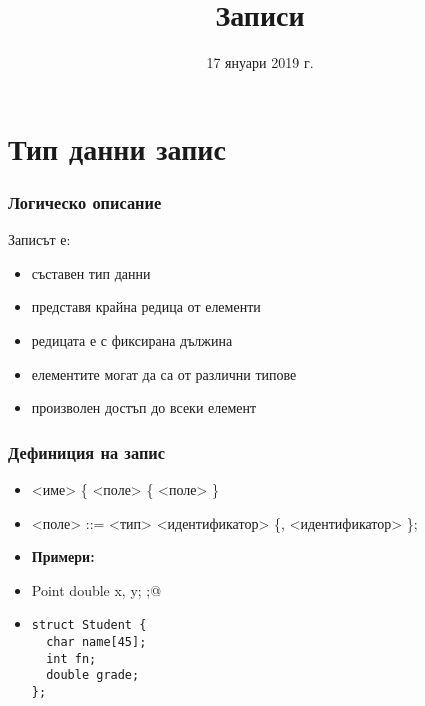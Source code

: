 \documentclass[alsotrans]{beamerswitch}
\title{Записи}
\date{17 януари 2019 г.}
\begin{document}
\begin{frame}
  \titlepage
\end{frame}

\section{Тип данни запис}


\begin{frame}
  \frametitle{Логическо описание}

Записът е:
\begin{itemize}[<+->]
\item съставен тип данни
\item представя крайна редица от елементи
\item редицата е с \alert<6>{фиксирана дължина}
\item елементите могат да са от \alert<6>{различни типове}
\item произволен достъп до всеки елемент
\end{itemize}
\end{frame}

\begin{frame}[fragile]
  \frametitle{Дефиниция на запис}

  \begin{itemize}[<+->]
  \item {} <име> \tta\{ <поле> \{ <поле> \} \tta{\};}
  \item{} <поле> ::= <тип> <идентификатор> \{\tta, <идентификатор> \}\tta;
  \item \textbf{Примери:}
  \item \lst@struct Point { double x, y; };@
  \item
\begin{lstlisting}
struct Student {
  char name[45];
  int fn;
  double grade;
};
\end{lstlisting}
  \end{itemize}
\end{frame}
\end{document}
